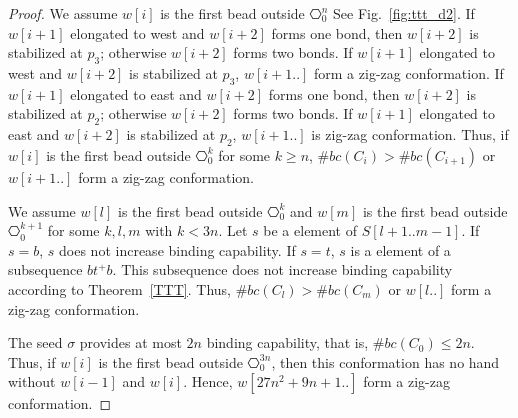 \begin{proof}
 We assume $w[i]$ is the first bead outside $\hexagon^n_0$
 See Fig.~\ref{fig:ttt_d2}.
 If $w[i+1]$ elongated to west and $w[i+2]$ forms one bond, then $w[i+2]$ is stabilized at $p_3$; otherwise $w[i+2]$ forms two bonds.
 If $w[i+1]$ elongated to west and $w[i+2]$ is stabilized at $p_3$, $w[i+1..]$ form a zig-zag conformation.
  If $w[i+1]$ elongated to east and $w[i+2]$ forms one bond, then $w[i+2]$ is stabilized at $p_2$; otherwise $w[i+2]$ forms two bonds.
 If $w[i+1]$ elongated to east and $w[i+2]$ is stabilized at $p_2$, $w[i+1..]$ is zig-zag conformation.
 Thus, if $w[i]$ is the first bead outside $\hexagon^k_0$ for some $k \geq n$, $\#bc(C_i) > \#bc(C_{i+1})$ or $w[i+1..]$ form a zig-zag conformation.
 
 We assume $w[l]$ is the first bead outside $\hexagon^k_0$ and $w[m]$ is the first bead outside $\hexagon^{k+1}_0$ for some $k,l,m$ with $k<3n$. Let $s$ be a element of $S[l+1..m-1]$. If $s = b$, $s$ does not increase binding capability.
 If $s=t$, $s$ is a element of a subsequence $bt^+b$. This subsequence does not increase binding capability according to Theorem~\ref{TTT}. Thus, $\#bc(C_l) > \#bc(C_{m})$ or $w[l..]$ form a zig-zag conformation.
 
 The seed $\sigma$ provides at most $2n$ binding capability, that is, $\#bc(C_0) \leq 2n$.
 Thus,  if  $w[i]$ is the first bead outside $\hexagon^{3n}_0$, then this conformation has no hand without $w[i-1]$ and $w[i]$.
 Hence, $w[27n^2 + 9n + 1..]$ form a zig-zag conformation.
\end{proof}

